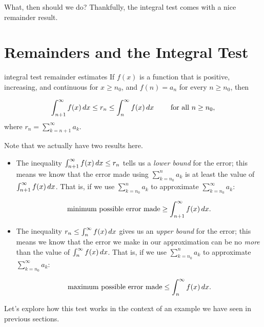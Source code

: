 \documentclass{ximera}
\begin{document}
What, then should we do?  Thankfully, the integral test comes with a nice remainder result.



\section{Remainders and the Integral Test}

\begin{theorem}{integral test remainder estimates}
If $f(x)$ is a function that is positive, increasing, and continuous for $x \geq n_0$,  and $f(n) = a_n$ for every $n \geq n_0$, then 

\[
\int_{n+1}^{\infty} f(x) \mathop{}\!d x \leq  r_n \leq \int_{n}^{\infty} f(x) \mathop{}\!d x \qquad \textrm{ for all } n \geq n_0,
\]
where $r_n = \sum_{k=n+1}^{\infty} a_k$.
\end{theorem}

Note that we actually have two results here.

\begin{itemize}
\item The inequality $\int_{n+1}^{\infty} f(x) \mathop{}\!d x \leq  r_n$ tells us a \emph{lower bound} for the error; this means we know that the error made using $\sum_{k=n_0}^n a_k$ is at least the value of $\int_{n+1}^{\infty} f(x) \mathop{}\!d x$.  That is, if we use $\sum_{k=n_0}^n a_k$ to approximate $\sum_{k=n_0}^\infty a_k$:

\[
\textrm{minimum possible error made}  \geq \int_{n+1}^{\infty} f(x) \mathop{}\!d x.
\]

\item The inequality $r_n \leq \int_{n}^{\infty} f(x) \mathop{}\!d x$ gives us an \emph{upper bound} for the error; this means we know that the error we make in our approximation can be no \emph{more} than the value of $\int_{n}^{\infty} f(x) \mathop{}\!d x$. That is, if we use $\sum_{k=n_0}^n a_k$ to approximate $\sum_{k=n_0}^\infty a_k$:

\[
\textrm{maximum possible error made}  \leq \int_{n}^{\infty} f(x) \mathop{}\!d x.
\]


\end{itemize}

Let's explore how this test works in the context of an example we have seen in previous sections.
\end{document}
